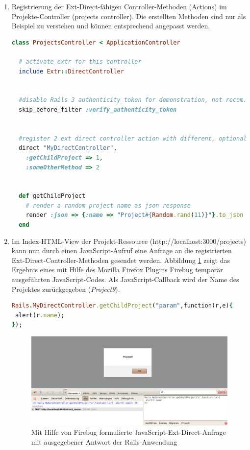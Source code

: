 \begin{enumerate}
\item
Registrierung der Ext-Direct-fähigen Controller-Methoden (Actions) im Projekte-Controller (projects controller). Die erstellten Methoden sind nur als Beispiel zu verstehen und können entsprechend angepasst werden.

\begin{lstlisting}[language=ruby,frame=single,title=\emph{app/controllers/projects\_controller.rb}, numbers=none]
class ProjectsController < ApplicationController

  # activate extr for this controller
  include Extr::DirectController


  #disable Rails 3 authenticity_token for demonstration, not recom. in production
  skip_before_filter :verify_authenticity_token


  #register 2 ext direct controller action with different, optional controller name (MyDirectController)
  direct "MyDirectController",
    :getChildProject => 1,
    :someOtherMethod => 2


  def getChildProject
    # render a random project name as json response
    render :json => {:name => "Project#{Random.rand(11)}"}.to_json
  end

\end{lstlisting}

\item
Im Index-HTML-View der Projekt-Ressource (http://localhost:3000/projects) kann nun durch einen JavaScript-Aufruf eine Anfrage an die registrierten Ext-Direct-Controller-Methoden gesendet werden. Abbildung \ref{extrreqeust} zeigt das Ergebnis eines mit Hilfe des Mozilla Firefox Plugins Firebug temporär ausgeführten JavaScript-Codes.
Als JavaScript-Callback wird der Name des Projektes zurückgegeben (\emph{Project9}).
\begin{lstlisting}[language=ruby,frame=single,title=\emph{JavaScript zum Aufruf des Projekt-Controllers in der Rails-Anwendung}]
Rails.MyDirectController.getChildProject("param",function(r,e){
 alert(r.name);
});

\end{lstlisting}

\begin{figure}[!h]
\begin{center}
\includegraphics[scale=0.4]{images/anhang/extrbrowserrequest.png}
\caption{Mit Hilfe von Firebug formulierte JavaScript-Ext-Direct-Anfrage mit ausgegebener Antwort der Rails-Anwendung}
\label{extrreqeust}
\end{center}
\end{figure}
\end{enumerate}

%

